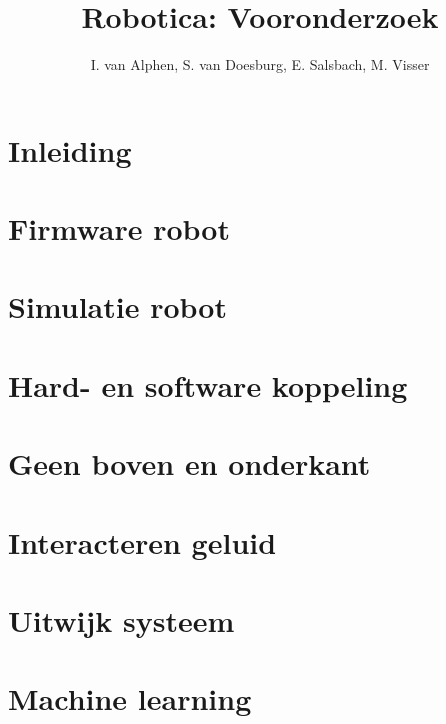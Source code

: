 \documentclass[10pt,a4paper]{article}
\title{Robotica: Vooronderzoek}
\author{I. van Alphen, S. van Doesburg, E.  Salsbach, M. Visser}
\begin{document}
\maketitle
\section{Inleiding}

\section{Firmware robot}

\section{Simulatie robot}

\section{Hard- en software koppeling}

\section{Geen boven en onderkant}

\section{Interacteren geluid}

\section{Uitwijk systeem}

\section{Machine learning}
\end{document}
